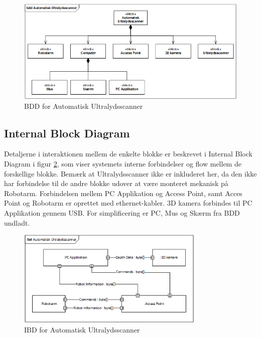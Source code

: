 \begin{figure}[H]
    \centering
    \includegraphics[width=1\textwidth]{figurer/d/Design/BDD}
    \caption{BDD for Automatisk Ultralydsscanner}
    \label{BDD}
\end{figure}

\subsection{Internal Block Diagram}
Detaljerne i interaktionen mellem de enkelte blokke er beskrevet i Internal Block Diagram i figur \ref{IBD}, som viser systemets interne forbindelser og flow mellem de forskellige blokke. Bemærk at Ultralydsscanner ikke er inkluderet her, da den ikke har forbindelse til de andre blokke udover at være monteret mekanisk på Robotarm. Forbindelsen mellem PC Applikation og Access Point, samt Acces Point og Robotarm er oprettet med ethernet-kabler. 3D kamera forbindes til PC Applikation gennem USB. For simplificering er PC, Mus og Skærm fra BDD undladt.

\begin{figure}[H]
    \centering
    \includegraphics[width=0.8\textwidth]{figurer/d/Design/IBD}
    \caption{IBD for Automatisk Ultralydsscanner}
    \label{IBD}
\end{figure}

